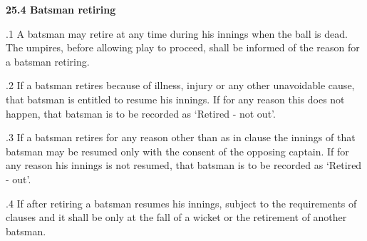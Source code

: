 \documentclass[12pt]{article}
\begin{document}
\vspace{\baselineskip}
{\fontsize{11pt}{13.2pt}\selectfont \textbf{25.4 \tabto{0.47in} Batsman retiring}\par}\par


\vspace{\baselineskip}
\begin{adjustwidth}{0.5in}{0.01in}
{\fontsize{9pt}{10.8pt}.1 \tabto{0.49in} A batsman may retire at any time during his innings when the ball is dead. The umpires, before allowing play to proceed, shall be informed of the reason for a batsman retiring.\par}\par

\end{adjustwidth}


\vspace{\baselineskip}
\begin{adjustwidth}{0.5in}{0.11in}
{\fontsize{9pt}{10.8pt}.2 \tabto{0.49in} If a batsman retires because of illness, injury or any other unavoidable cause, that batsman is entitled to resume his innings. If for any reason this does not happen, that batsman is to be recorded as ‘Retired - not out’.\par}\par

\end{adjustwidth}


\vspace{\baselineskip}
\begin{adjustwidth}{0.5in}{0.25in}
{\fontsize{9pt}{10.8pt}.3 \tabto{0.49in} If a batsman retires for any reason other than as in clause the innings of that batsman may be resumed only with the consent of the opposing captain. If for any reason his innings is not resumed, that batsman is to be recorded as ‘Retired - out’.\par}\par

\end{adjustwidth}


\vspace{\baselineskip}
\begin{adjustwidth}{0.5in}{0.15in}
{\fontsize{9pt}{10.8pt}.4 \tabto{0.49in} If after retiring a batsman resumes his innings, subject to the requirements of clauses and it shall be only at the fall of a wicket or the retirement of another batsman.\par}\par

\end{adjustwidth}
\end{document}
